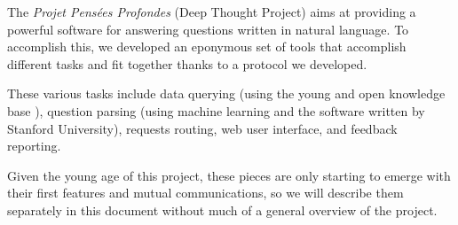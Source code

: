 The {\em Projet Pensées Profondes} (Deep Thought Project) aims at
providing a powerful software for answering questions written in
natural language.
To accomplish this, we developed an eponymous set of tools that
accomplish different tasks and fit together thanks to a protocol
we developed.

These various tasks include data querying (using the young and open
knowledge base \Wikidata), question parsing (using machine learning and the
\CoreNLP software written by Stanford University),
requests routing, web user interface, and feedback reporting.

Given the young age of this project, these pieces are only starting
to emerge with their first features and mutual communications,
so we will describe them separately in this document without
much of a general overview of the project.

